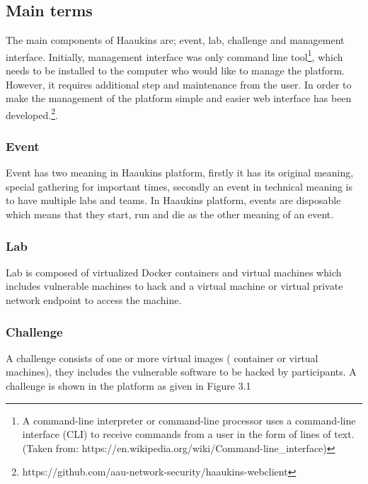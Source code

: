 \subsection{Main terms}
 
 The main components of Haaukins are; event, lab, challenge and management interface. Initially, management interface was only command line tool\footnote{A command-line interpreter or command-line processor uses a command-line interface (CLI) to receive commands from a user in the form of lines of text. (Taken from: https://en.wikipedia.org/wiki/Command-line_interface)}, which needs to be installed to the computer who would like to manage the platform. However, it requires additional step and maintenance from the user. In order to make the management of the platform simple and easier web interface has been developed.\footnote{https://github.com/aau-network-security/haaukins-webclient}. 
 \subsubsection{Event}
 Event has two meaning in Haaukins platform, firstly it has its original meaning, special gathering for important times, secondly an event  in technical meaning is to have multiple labs and teams. In Haaukins platform, events are disposable which means that they start, run and die as the other meaning of an event. 
 
 \subsubsection{Lab}
 Lab is composed of virtualized Docker containers and virtual machines which includes vulnerable machines to hack and a virtual machine or virtual private network endpoint to access the machine. 
 
 \subsubsection{Challenge}
 A challenge consists of one or more virtual images ( container or virtual machines), they includes the vulnerable software to be hacked by participants. A challenge is shown in the platform as given in Figure 3.1
 
